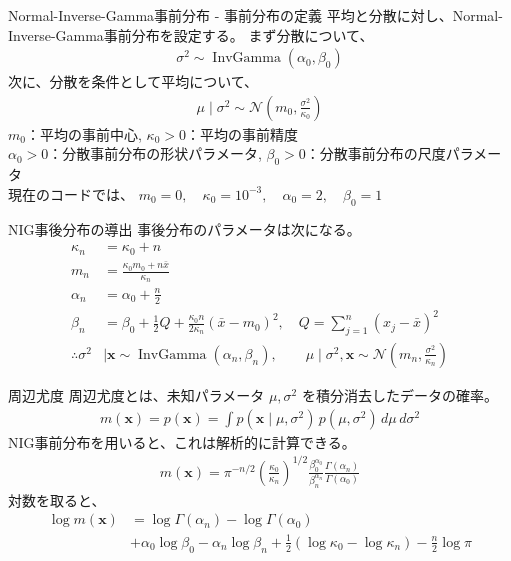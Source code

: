 \documentclass[dvipdfmx, 11pt, aspectratio=169, notheorems]{beamer}
\begin{document}
\begin{frame}{Normal-Inverse-Gamma事前分布 - 事前分布の定義}
    平均と分散に対し、Normal-Inverse-Gamma事前分布を設定する。
    まず分散について、
    \begin{align}
        \sigma^2 \sim \operatorname{InvGamma}(\alpha_0,\beta_0)
    \end{align}
    次に、分散を条件として平均について、
    \begin{align}
        \mu\mid\sigma^2 \sim \mathcal N \left( m_0,\frac{\sigma^2}{\kappa_0} \right)
    \end{align}
    \(m_0\)：平均の事前中心, \qquad \(\kappa_0>0\)：平均の事前精度 \\
    \(\alpha_0>0\)：分散事前分布の形状パラメータ, \qquad \(\beta_0>0\)：分散事前分布の尺度パラメータ \\
    {\scriptsize 現在のコードでは、
    $m_0=0, \quad \kappa_0=10^{-3}, \quad \alpha_0=2, \quad \beta_0=1$}
\end{frame}

\begin{frame}{NIG事後分布の導出}
    事後分布のパラメータは次になる。
    \begin{align}
        \kappa_n &= \kappa_0+n \\
        m_n &= \frac{\kappa_0m_0+n\bar{x}}{\kappa_n} \\
        \alpha_n &= \alpha_0+\frac{n}{2} \\
        \beta_n &= \beta_0 + \frac{1}{2}Q + \frac{\kappa_0n}{2\kappa_n}(\bar{x}-m_0)^2, \quad Q = \sum_{j=1}^{n} (x_j-\bar{x})^2 \\
        \therefore \sigma^2 &\mid\boldsymbol x \sim \operatorname{InvGamma} (\alpha_n,\beta_n) , \qquad 
        \mu\mid\sigma^2,\boldsymbol x \sim \mathcal N \left( m_n,\frac{\sigma^2}{\kappa_n} \right)
    \end{align}
\end{frame}

\begin{frame}{周辺尤度}
    周辺尤度とは、未知パラメータ \(\mu,\sigma^2\) を積分消去したデータの確率。
    \begin{align}
        m(\boldsymbol x) = p(\boldsymbol x) = \int p(\boldsymbol x\mid\mu,\sigma^2) \, p(\mu,\sigma^2) \, d\mu\,d\sigma^2
    \end{align}
    NIG事前分布を用いると、これは解析的に計算できる。
    \begin{align}
        m(\boldsymbol x) = \pi^{-n/2} \left( \frac{\kappa_0}{\kappa_n} \right)^{1/2} \frac{ \beta_0^{\alpha_0}}{\beta_n^{\alpha_n}}
        \frac{ \Gamma(\alpha_n)}{\Gamma(\alpha_0)}
    \end{align}
    対数を取ると、
    \begin{align}
        \log m(\boldsymbol x) &= \log\Gamma(\alpha_n) - \log\Gamma(\alpha_0) \\
        &+ \alpha_0\log\beta_0 - \alpha_n\log\beta_n
        + \frac{1}{2}
    \left( \log\kappa_0-\log\kappa_n \right) - \frac{n}{2}\log\pi
    \end{align}
\end{frame}
\end{document}
